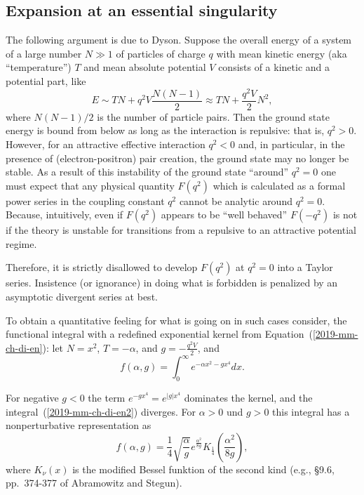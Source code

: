 \newpage

\subsection{Expansion at an essential singularity}

The following argument is due to Dyson.\cite{PhysRev.85.631,LeGuillou-Zinn-Justin,Svozil-2023-axioms12010072}
Suppose
the overall energy of a system of a large number $N \gg 1$ of particles
of charge $q$ with mean kinetic energy (aka ``temperature'') $T$
and mean absolute potential $V$
consists of a kinetic and a potential part, like
\begin{equation}
E\sim T N + q^2 V \frac{N(N-1)}{2}\approx T N + \frac{q^2V}{2} N^2,
\label{2019-mm-ch-di-en}
\end{equation}
where ${N(N-1)}/{2}$ is the number of particle pairs.
Then the ground state energy is bound from below as long as the interaction is repulsive: that is, $q^2>0$.
However, for an attractive effective interaction $q^2<0$ and, in particular,
in the presence of (electron-positron) pair creation, the ground state may no longer be stable.
As a result of this instability of the ground state ``around'' $q^2=0$
one must expect that any physical quantity $F(q^2)$ which is calculated as a formal
power series in the coupling constant $q^2$ cannot be analytic around $q^2=0$.
Because, intuitively, even if $F(q^2)$ appears to be ``well behaved'' $F(-q^2)$ is not
if the theory is unstable for transitions from a repulsive to an attractive potential regime.


Therefore, it is strictly disallowed to develop $F(q^2)$ at $q^2=0$ into a Taylor series.
Insistence (or ignorance) in doing what is forbidden is penalized by an asymptotic divergent series at best.


To obtain a quantitative feeling for what is going on in such cases consider\cite{sommer-AR},
the functional integral
with a redefined exponential kernel from Equation~(\ref{2019-mm-ch-di-en}):
let $N=x^2$,   $T  = -\alpha$, and $g = - \frac{q^2V}{2}$, and
\begin{equation}
f\left(\alpha,g\right)=\int_{0}^{\infty}e^{-\alpha x^{2}-gx^{4}}dx  .
\label{2019-mm-ch-di-en2}
\end{equation}

For negative $g<0$ the term  $e^{-gx^{4}}=e^{|g|x^{4}}$ dominates the kernel, and the integral~(\ref{2019-mm-ch-di-en2}) diverges.
For $\alpha>0$ und $g>0$  this integral has a nonperturbative representation as
\begin{equation}
f\left(\alpha,g\right)=\frac{1}{4}\sqrt{\frac{\alpha}{g}}e^{\frac{\alpha^{2}}{8g}}K_{\frac{1}{4}}\left(\frac{\alpha^{2}}{8g}\right) ,
\label{2019-mm-ch-di-ennp}
\end{equation}
where $K_{\nu}\left(x\right)$ is the modified Bessel funktion of the second kind
(e.g., {\S}9.6, pp.~374-377  of Abramowitz and Stegun).

